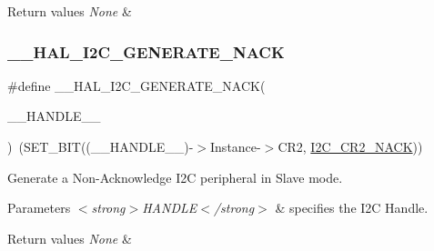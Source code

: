 \begin{DoxyRetVals}{Return values}
{\em None} & \\
\hline
\end{DoxyRetVals}
\mbox{\label{group___i2_c___exported___macros_ga11f1b2e130ffa7e62d82ff1ebdb3f4f4}} 
\subsubsection{\texorpdfstring{\_\_HAL\_I2C\_GENERATE\_NACK}{\_\_HAL\_I2C\_GENERATE\_NACK}}
{\footnotesize\ttfamily \#define \+\_\+\+\_\+\+H\+A\+L\+\_\+\+I2\+C\+\_\+\+G\+E\+N\+E\+R\+A\+T\+E\+\_\+\+N\+A\+CK(\begin{DoxyParamCaption}\item[{}]{\+\_\+\+\_\+\+H\+A\+N\+D\+L\+E\+\_\+\+\_\+ }\end{DoxyParamCaption})~(S\+E\+T\+\_\+\+B\+IT((\+\_\+\+\_\+\+H\+A\+N\+D\+L\+E\+\_\+\+\_\+)-\/$>$Instance-\/$>$C\+R2, \mbox{\hyperlink{group___peripheral___registers___bits___definition_ga8bcbbaf564cb68e3afed79c3cd34aa1f}{I2\+C\+\_\+\+C\+R2\+\_\+\+N\+A\+CK}}))}



Generate a Non-\/\+Acknowledge I2C peripheral in Slave mode. 


\begin{DoxyParams}{Parameters}
{\em $<$strong$>$\+H\+A\+N\+D\+L\+E$<$/strong$>$} & specifies the I2C Handle. \\
\hline
\end{DoxyParams}

\begin{DoxyRetVals}{Return values}
{\em None} & \\
\hline
\end{DoxyRetVals}
\mbox{\label{group___i2_c___exported___macros_ga932024bf4a259e0cdaf9e50b38e3d41a}} 
